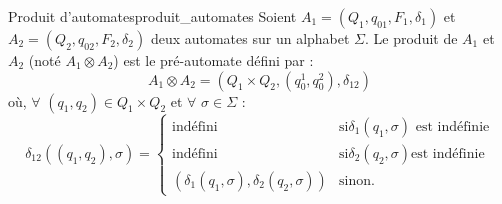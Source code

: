 \begin{definition}{Produit d'automates}{produit_automates}
    Soient $A_1 = (Q_1, q_{01}, F_1, \delta_1)$ et $A_2 = (Q_2, q_{02}, F_2, \delta_2)$ deux automates sur un alphabet $\Sigma$.
    Le produit de $A_1$ et $A_2$ (noté $A_1\otimes A_2$) est le pré-automate défini par :
    \begin{equation*}
        A_1\otimes A_2 = (Q_1\times Q_2, (q_0^1, q_0^2), \delta_{12})
    \end{equation*}
    où, $\forall$ $(q_1, q_2) \in Q_1\times Q_2$ et $\forall$ $\sigma \in \Sigma$ :
    $$ \delta_{12}((q_1,q_2), \sigma) =
    \begin{cases}
        \text{indéfini} & \text{si} \delta_1(q_1,\sigma) \text{ est indéfinie} \\
        \text{indéfini} & \text{si} \delta_2(q_2,\sigma) \text {est indéfinie} \\
        (\delta_1(q_1,\sigma), \delta_2(q_2,\sigma)) & \text{sinon.}
    \end{cases} $$
\end{definition}
